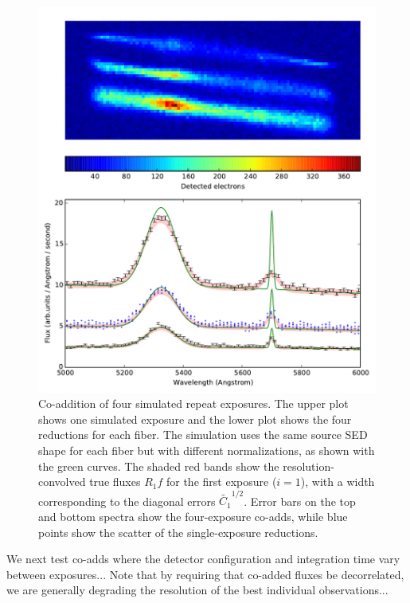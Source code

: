 \documentclass[12pt]{article}
\begin{document}
\begin{figure}[htb]
\begin{center}
\includegraphics[width=5in]{fig/repeats}
\caption{Co-addition of four simulated repeat exposures. The upper plot shows one simulated exposure and the lower plot shows the four reductions for each fiber. The simulation uses the same source SED shape for each fiber but with different normalizations, as shown with the green curves.  The shaded red bands show the resolution-convolved true fluxes $R_1 f$ for the first exposure ($i=1$), with a width corresponding to the diagonal errors $\tilde{C_1}^{1/2}$. Error bars on the top and bottom spectra show the four-exposure co-adds, while blue points show the scatter of the single-exposure reductions.}
\label{fig:repeats}
\end{center}
\end{figure}

We next test co-adds where the detector configuration and integration time vary between exposures... Note that by requiring that co-added fluxes be decorrelated, we are generally degrading the resolution of the best individual observations...
\end{document}
